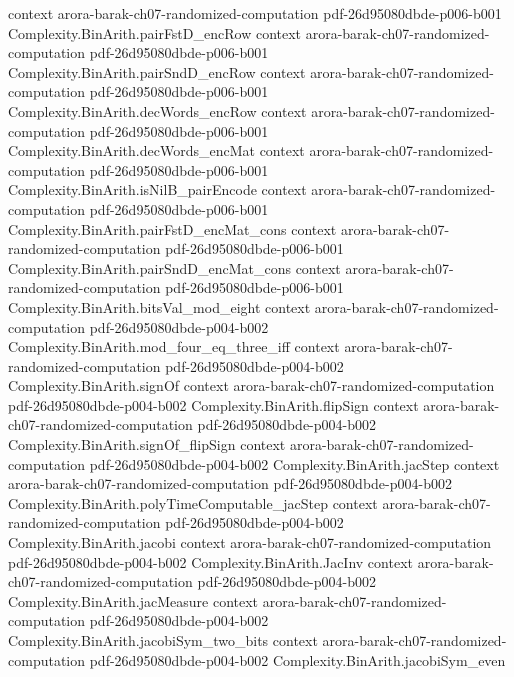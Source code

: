 \begin{theorem}
  {context}
  {arora-barak-ch07-randomized-computation}
  {pdf-26d95080dbde-p006-b001}
\proofstep
  {Complexity.BinArith.pairFstD_encRow}
  {context}
  {arora-barak-ch07-randomized-computation}
  {pdf-26d95080dbde-p006-b001}
\proofstep
  {Complexity.BinArith.pairSndD_encRow}
  {context}
  {arora-barak-ch07-randomized-computation}
  {pdf-26d95080dbde-p006-b001}
\proofstep
  {Complexity.BinArith.decWords_encRow}
  {context}
  {arora-barak-ch07-randomized-computation}
  {pdf-26d95080dbde-p006-b001}
\proofstep
  {Complexity.BinArith.decWords_encMat}
  {context}
  {arora-barak-ch07-randomized-computation}
  {pdf-26d95080dbde-p006-b001}
\proofstep
  {Complexity.BinArith.isNilB_pairEncode}
  {context}
  {arora-barak-ch07-randomized-computation}
  {pdf-26d95080dbde-p006-b001}
\proofstep
  {Complexity.BinArith.pairFstD_encMat_cons}
  {context}
  {arora-barak-ch07-randomized-computation}
  {pdf-26d95080dbde-p006-b001}
\proofstep
  {Complexity.BinArith.pairSndD_encMat_cons}
  {context}
  {arora-barak-ch07-randomized-computation}
  {pdf-26d95080dbde-p006-b001}
\proofstep
  {Complexity.BinArith.bitsVal_mod_eight}
  {context}
  {arora-barak-ch07-randomized-computation}
  {pdf-26d95080dbde-p004-b002}
\proofstep
  {Complexity.BinArith.mod_four_eq_three_iff}
  {context}
  {arora-barak-ch07-randomized-computation}
  {pdf-26d95080dbde-p004-b002}
\proofstep
  {Complexity.BinArith.signOf}
  {context}
  {arora-barak-ch07-randomized-computation}
  {pdf-26d95080dbde-p004-b002}
\proofstep
  {Complexity.BinArith.flipSign}
  {context}
  {arora-barak-ch07-randomized-computation}
  {pdf-26d95080dbde-p004-b002}
\proofstep
  {Complexity.BinArith.signOf_flipSign}
  {context}
  {arora-barak-ch07-randomized-computation}
  {pdf-26d95080dbde-p004-b002}
\proofstep
  {Complexity.BinArith.jacStep}
  {context}
  {arora-barak-ch07-randomized-computation}
  {pdf-26d95080dbde-p004-b002}
\proofstep
  {Complexity.BinArith.polyTimeComputable_jacStep}
  {context}
  {arora-barak-ch07-randomized-computation}
  {pdf-26d95080dbde-p004-b002}
\proofstep
  {Complexity.BinArith.jacobi}
  {context}
  {arora-barak-ch07-randomized-computation}
  {pdf-26d95080dbde-p004-b002}
\proofstep
  {Complexity.BinArith.JacInv}
  {context}
  {arora-barak-ch07-randomized-computation}
  {pdf-26d95080dbde-p004-b002}
\proofstep
  {Complexity.BinArith.jacMeasure}
  {context}
  {arora-barak-ch07-randomized-computation}
  {pdf-26d95080dbde-p004-b002}
\proofstep
  {Complexity.BinArith.jacobiSym_two_bits}
  {context}
  {arora-barak-ch07-randomized-computation}
  {pdf-26d95080dbde-p004-b002}
\proofstep
  {Complexity.BinArith.jacobiSym_even}

\end{theorem}
